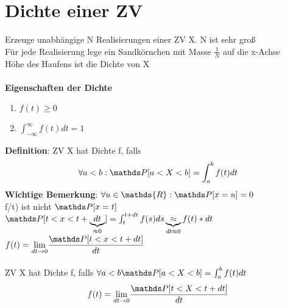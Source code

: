\section{Dichte einer ZV}
Erzeuge unabhängige N Realisierungen einer ZV X. N ist sehr groß \medskip\\
Für jede Realisierung lege ein Sandkörnchen mit Masse $ \frac{1}{N} $ auf die x-Achse\smallskip\\ Höhe des Haufens ist die Dichte von X\smallskip\\
\smallskip\\
\textbf{Eigenschaften der Dichte}
\begin{enumerate}
	\item $f(t) \geq 0$
	\item $\displaystyle \int_{-\infty}^{\infty}f(t) dt=1$
\end{enumerate}
\textbf{Definition}: ZV X hat Dichte f, falls 
$$\forall a < b : \PP[a<X<b] = \int_{a}^{b}f(t) dt$$
\textbf{Wichtige Bemerkung}: $\forall u \in \mathds{R}:\PP[x = u] = 0$\smallskip\\
f/t) ist nicht $\PP [x=t]$\smallskip\\
$\PP [t < x < t+ \underbrace{dt}_{\approx 0}]= \int_{t}^{t+dt}f(s)ds \underbrace{\approx}_{dt \approx 0} f(t)*dt$\smallskip\\
$f(t) = \underset{dt \rightarrow 0}{\text{lim}}  \dfrac{\PP[t<x<t+dt]}{dt}$\medskip\\
\medskip\\
ZV X hat Dichte f, falls $\forall a < b \PP[a < X < b] = \int_{a}^{b} f(t)dt$
$$f(t) = \underset{dt \rightarrow 0}{\text{lim}} \dfrac{\PP [t< X < t+dt]}{dt}$$
